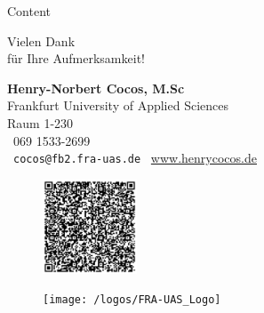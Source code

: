 \documentclass[german]{beamer}
\title{\myTitle}
\subtitle{\footnotesize\mySubtitle}
\author{\myAuthorOne}
\author{\myAuthorOne}
\institute{
	\nolinkurl{\myEmail}\\

	\ifgerman
	\textbf{\thisStudyGerman}\newline
	\textbf{\thisFacultyGerman}\newline
	\textbf{\thisInstitute}\newline
	\textbf{\thisCityGerman}
	\else
	\textbf{\thisStudyEnglish}\newline
	\textbf{\thisFacultyEnglish}\newline
	\textbf{\thisInstitute}\newline
	\textbf{\thisCityEnglish}
	\fi	
}
\date{\today}
\newif\ifgerman
\begin{document}
\begin{frame}
\titlepage
\end{frame}

\begin{frame}{{\ifgerman Inhalt\else Content\fi}}
	\tableofcontents
\end{frame}



		


\ifgerman
\begin{frame}
	
	\begin{center}
		{\fontsize{30}{40}\selectfont Vielen Dank\\ für Ihre Aufmerksamkeit!}
	\end{center}
	\hfill
	
	\centering	
	\begin{minipage}{0.5\textwidth}
		\raggedright
		\textbf{Henry-Norbert Cocos, M.Sc}\\\vfill
		Frankfurt University of Applied Sciences\\\vfill
		Raum 1-230\\\vfill
		\phone~069 1533-2699\\\vfill
		\Letter~\nolinkurl{cocos@fb2.fra-uas.de}
		\Mundus~\url{www.henrycocos.de}
		\begin{figure}[htbp]
			\raggedright
			\includegraphics[width=0.25\textwidth]{Cocos_FRAUAS}
		\end{figure}
	\end{minipage}%
	\begin{minipage}{0.45\textwidth}
		\begin{figure}[htbp]
			\centering
			\texttt{[image: /logos/FRA-UAS\_Logo]}
		\end{figure}
		\vspace{40pt}
	\end{minipage}
\end{frame}
\end{document}
